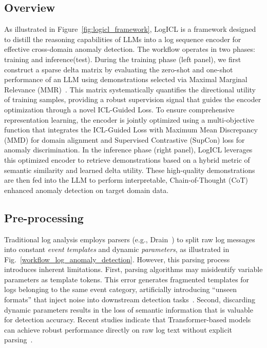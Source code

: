 \documentclass[lettersize,journal]{IEEEtran}
\begin{document}
\subsection{Overview}
As illustrated in Figure~\ref{fig:logicl_framework}, LogICL is a framework designed to distill the reasoning capabilities of LLMs into a log sequence encoder for effective cross-domain anomaly detection. The workflow operates in two phases: training and inference(test). During the training phase (left panel), we first construct a sparse delta matrix by evaluating the zero-shot and one-shot performance of an LLM using demonstrations selected via Maximal Marginal Relevance (MMR)~\cite{gretton2012kernel}. This matrix systematically quantifies the directional utility of training samples, providing a robust supervision signal that guides the encoder optimization through a novel ICL-Guided Loss. To ensure comprehensive representation learning, the encoder is jointly optimized using a multi-objective function that integrates the ICL-Guided Loss with Maximum Mean Discrepancy (MMD) for domain alignment and Supervised Contrastive (SupCon) loss for anomaly discrimination. In the inference phase (right panel), LogICL leverages this optimized encoder to retrieve demonstrations based on a hybrid metric of semantic similarity and learned delta utility. These high-quality demonstrations are then fed into the LLM to perform interpretable, Chain-of-Thought (CoT) enhanced anomaly detection on target domain data.

\subsection{Pre-processing}

Traditional log analysis employs parsers (e.g., Drain~\cite{he2017drain}) to split raw log messages into constant \textit{event templates} and dynamic \textit{parameters}, as illustrated in Fig.~\ref{workflow_log_anomaly_detection}. However, this parsing process introduces inherent limitations. First, parsing algorithms may misidentify variable parameters as template tokens. This error generates fragmented templates for logs belonging to the same event category, artificially introducing ``unseen formats'' that inject noise into downstream detection tasks~\cite{chen2021neurallog, jiang2024large, jiang2024lilac, le2023log}. Second, discarding dynamic parameters results in the loss of semantic information that is valuable for detection accuracy. Recent studies indicate that Transformer-based models can achieve robust performance directly on raw log text without explicit parsing~\cite{guan2024logllm, chen2021neurallog}.
\end{document}
